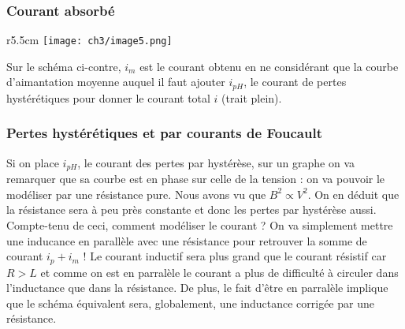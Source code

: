 		\subsubsection{Courant absorbé}
		\begin{wrapfigure}[10]{r}{5.5cm}
		\texttt{[image: ch3/image5.png]}
		\end{wrapfigure}
		Sur le schéma ci-contre, $i_m$ 
		est le courant obtenu en ne considérant que la courbe d'aimantation 
		moyenne auquel il faut ajouter $i_{pH}$, le courant de pertes 
		hystérétiques pour donner le courant total $i$ (trait plein).
		
		
		\subsubsection{Pertes hystérétiques et par courants de Foucault}
		Si on place $i_{pH}$, le courant des pertes par hystérèse, sur un graphe
		 on va remarquer que sa courbe est en phase sur celle de la tension : 
		 on va pouvoir le modéliser par une résistance pure. Nous avons vu que 
		 $B^2\propto V^2$. On en déduit que la résistance sera à peu près 
		 constante et donc les pertes par hystérèse aussi.		\\
		 
		Compte-tenu de ceci, comment modéliser le courant ? On va simplement 
		mettre une inducance en parallèle avec une résistance pour retrouver 
		la somme de courant $i_p+i_m$ ! Le courant inductif sera plus grand 
		que le courant résistif car $R > L$ et comme on est en parralèle le 
		courant a plus de difficulté à circuler dans l'inductance que dans 
		la résistance. De plus, le fait d'être en parralèle implique que 
		le schéma équivalent sera, globalement, une inductance corrigée 
		par une résistance.
		
